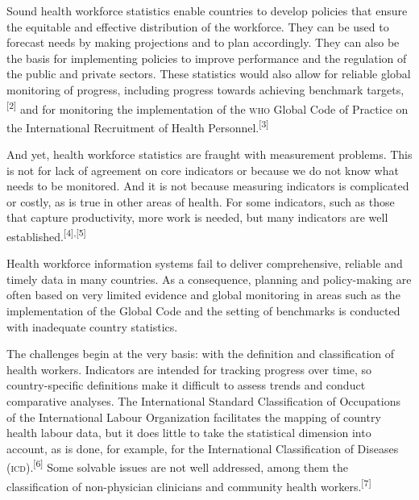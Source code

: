 \documentclass{article}
\begin{document}
Sound health workforce statistics enable countries to develop policies that
ensure the
equitable and effective distribution of the workforce. They can be used to
forecast
needs by making projections and to plan accordingly. They can also be the basis
for
implementing policies to improve performance and the regulation of the public
and
private sectors. These statistics would also allow for reliable global
monitoring of
progress, including progress towards achieving benchmark
targets,\textsuperscript{[}\textsuperscript{2}\textsuperscript{]}
and for monitoring the implementation of the \textsc{who} Global Code of Practice on the
International Recruitment of Health
Personnel.\textsuperscript{[}\textsuperscript{3}\textsuperscript{]}

And yet, health workforce statistics are fraught with measurement problems. This
is not
for lack of agreement on core indicators or because we do not know what needs to
be
monitored. And it is not because measuring indicators is complicated or costly,
as is
true in other areas of health. For some indicators, such as those that capture
productivity, more work is needed, but many indicators are well
established.\textsuperscript{[}\textsuperscript{4}\textsuperscript{]}\textsuperscript{,}\textsuperscript{[}\textsuperscript{5}\textsuperscript{]}

Health workforce information systems fail to deliver comprehensive, reliable and
timely
data in many countries. As a consequence, planning and policy-making are often
based on
very limited evidence and global monitoring in areas such as the implementation
of the
Global Code and the setting of benchmarks is conducted with inadequate country
statistics.

The challenges begin at the very basis: with the definition and classification
of health
workers. Indicators are intended for tracking progress over time, so
country-specific
definitions make it difficult to assess trends and conduct comparative analyses.
The
International Standard Classification of Occupations of the International Labour
Organization facilitates the mapping of country health labour data, but it does
little
to take the statistical dimension into account, as is done, for example, for the
International Classification of Diseases
(\textsc{icd}).\textsuperscript{[}\textsuperscript{6}\textsuperscript{]}
Some solvable issues are not well addressed, among them the classification of
non-physician clinicians and community health
workers.\textsuperscript{[}\textsuperscript{7}\textsuperscript{]}
\end{document}
